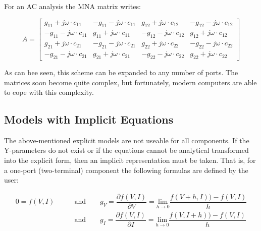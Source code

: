 For an AC analysis the MNA matrix writes:

\begin{equation}
A =
\begin{bmatrix}
 g_{11} + j\omega\cdot c_{11} & -g_{11} - j\omega\cdot c_{11} &  g_{12} + j\omega\cdot c_{12} & -g_{12} - j\omega\cdot c_{12}\\
-g_{11} - j\omega\cdot c_{11} &  g_{11} + j\omega\cdot c_{11} & -g_{12} - j\omega\cdot c_{12} &  g_{12} + j\omega\cdot c_{12}\\
 g_{21} + j\omega\cdot c_{21} & -g_{21} - j\omega\cdot c_{21} &  g_{22} + j\omega\cdot c_{22} & -g_{22} - j\omega\cdot c_{22}\\
-g_{21} - j\omega\cdot c_{21} &  g_{21} + j\omega\cdot c_{21} & -g_{22} - j\omega\cdot c_{22} &  g_{22} + j\omega\cdot c_{22}
\end{bmatrix}
\end{equation}

As can bee seen, this scheme can be expanded to any number of ports.
The matrices soon become quite complex, but fortunately, modern
computers are able to cope with this complexity.


\subsection{Models with Implicit Equations}

The above-mentioned explicit models are not useable for all components.
If the Y-parameters do not exist or if the equations cannot be
analytical transformed into the explicit form, then an implicit
representation must be taken. That is, for a one-port (two-terminal)
component the following formulas are defined by the user:

\begin{align}
0 = f(V, I) \qquad & \text{and}\qquad
  g_V = \dfrac{\partial f(V, I)}{\partial V}
      = \underset{h\rightarrow 0}{\text{lim}}\dfrac{f(V+h, I)) - f(V, I)}{h}\\
                   & \text{and}\qquad
  g_I = \dfrac{\partial f(V, I)}{\partial I}
      = \underset{h\rightarrow 0}{\text{lim}}\dfrac{f(V, I+h)) - f(V, I)}{h}
\end{align}
